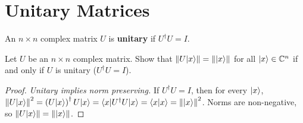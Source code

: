 \section{Unitary Matrices}

\begin{definition}\label{def:unitary-0915}
    An $n \times n$ complex matrix $U$ is \textbf{unitary} if $U^\dagger U = I$.
\end{definition}

\begin{exercisebox}
\begin{exercise}\label{ex:unitary-0915}\label{thm:unitary-0915}
    Let $U$ be an $n \times n$ complex matrix. Show that $\left\lVert U \lvert x \rangle \right\rVert = \left\lVert \lvert x \rangle \right\rVert$ for all
    $\lvert x \rangle \in \mathbb{C}^n$ if and only if $U$ is unitary ($U^\dagger U = I$).
\end{exercise}
\tcblower
\begin{proof}
    \emph{Unitary implies norm preserving.} If $U^\dagger U = I$, then for every $\lvert x \rangle$,
    $\left\lVert U \lvert x \rangle \right\rVert^2 = \left(U \lvert x \rangle\right)^\dagger U \lvert x \rangle = \langle x \rvert U^\dagger U \lvert x \rangle
        = \langle x \vert x \rangle = \left\lVert \lvert x \rangle \right\rVert^2$.
    Norms are non-negative, so $\left\lVert U \lvert x \rangle \right\rVert = \left\lVert \lvert x \rangle \right\rVert$.


\end{proof}
\end{exercisebox}
